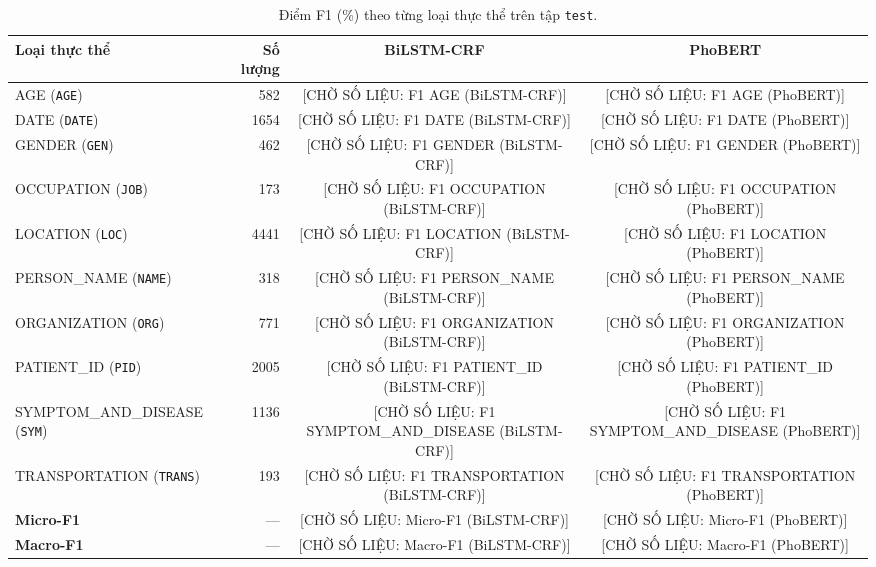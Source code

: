 \begin{table}[t]
\centering
\small
\begin{tabular}{lrcc}
\hline
\textbf{Loại thực thể} & \textbf{Số lượng} & \textbf{BiLSTM-CRF} & \textbf{PhoBERT} \\
\hline
AGE (\texttt{AGE}) & 582 & [CHỜ SỐ LIỆU: F1 AGE (BiLSTM-CRF)] & [CHỜ SỐ LIỆU: F1 AGE (PhoBERT)] \\
DATE (\texttt{DATE}) & 1654 & [CHỜ SỐ LIỆU: F1 DATE (BiLSTM-CRF)] & [CHỜ SỐ LIỆU: F1 DATE (PhoBERT)] \\
GENDER (\texttt{GEN}) & 462 & [CHỜ SỐ LIỆU: F1 GENDER (BiLSTM-CRF)] & [CHỜ SỐ LIỆU: F1 GENDER (PhoBERT)] \\
OCCUPATION (\texttt{JOB}) & 173 & [CHỜ SỐ LIỆU: F1 OCCUPATION (BiLSTM-CRF)] & [CHỜ SỐ LIỆU: F1 OCCUPATION (PhoBERT)] \\
LOCATION (\texttt{LOC}) & 4441 & [CHỜ SỐ LIỆU: F1 LOCATION (BiLSTM-CRF)] & [CHỜ SỐ LIỆU: F1 LOCATION (PhoBERT)] \\
PERSON\_NAME (\texttt{NAME}) & 318 & [CHỜ SỐ LIỆU: F1 PERSON\_NAME (BiLSTM-CRF)] & [CHỜ SỐ LIỆU: F1 PERSON\_NAME (PhoBERT)] \\
ORGANIZATION (\texttt{ORG}) & 771 & [CHỜ SỐ LIỆU: F1 ORGANIZATION (BiLSTM-CRF)] & [CHỜ SỐ LIỆU: F1 ORGANIZATION (PhoBERT)] \\
PATIENT\_ID (\texttt{PID}) & 2005 & [CHỜ SỐ LIỆU: F1 PATIENT\_ID (BiLSTM-CRF)] & [CHỜ SỐ LIỆU: F1 PATIENT\_ID (PhoBERT)] \\
SYMPTOM\_AND\_DISEASE (\texttt{SYM}) & 1136 & [CHỜ SỐ LIỆU: F1 SYMPTOM\_AND\_DISEASE (BiLSTM-CRF)] & [CHỜ SỐ LIỆU: F1 SYMPTOM\_AND\_DISEASE (PhoBERT)] \\
TRANSPORTATION (\texttt{TRANS}) & 193 & [CHỜ SỐ LIỆU: F1 TRANSPORTATION (BiLSTM-CRF)] & [CHỜ SỐ LIỆU: F1 TRANSPORTATION (PhoBERT)] \\
\hline
\textbf{Micro-F1} & — & [CHỜ SỐ LIỆU: Micro-F1 (BiLSTM-CRF)] & [CHỜ SỐ LIỆU: Micro-F1 (PhoBERT)] \\
\textbf{Macro-F1} & — & [CHỜ SỐ LIỆU: Macro-F1 (BiLSTM-CRF)] & [CHỜ SỐ LIỆU: Macro-F1 (PhoBERT)] \\
\hline
\end{tabular}
\caption{Điểm F1 (\%) theo từng loại thực thể trên tập \texttt{test}.}
\label{tab:per_entity_f1}
\end{table}

